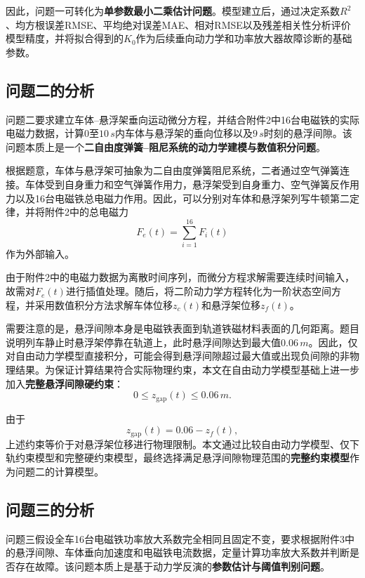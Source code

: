 \documentclass[a4paper]{nmmcm}
\begin{document}
因此，问题一可转化为\textbf{单参数最小二乘估计问题}。模型建立后，通过决定系数$R^2$、均方根误差RMSE、平均绝对误差MAE、相对RMSE以及残差相关性分析评价模型精度，并将拟合得到的$K_0$作为后续垂向动力学和功率放大器故障诊断的基础参数。

\subsection{问题二的分析}

问题二要求建立车体--悬浮架垂向运动微分方程，并结合附件2中16台电磁铁的实际电磁力数据，计算$0$至$10\,s$内车体与悬浮架的垂向位移以及$9\,s$时刻的悬浮间隙。该问题本质上是一个\textbf{二自由度弹簧--阻尼系统的动力学建模与数值积分问题}。

根据题意，车体与悬浮架可抽象为二自由度弹簧阻尼系统，二者通过空气弹簧连接。车体受到自身重力和空气弹簧作用力，悬浮架受到自身重力、空气弹簧反作用力以及16台电磁铁总电磁力作用。因此，可以分别对车体和悬浮架列写牛顿第二定律，并将附件2中的总电磁力
\begin{equation}
F_e(t)=\sum_{i=1}^{16}F_i(t)
\end{equation}
作为外部输入。

由于附件2中的电磁力数据为离散时间序列，而微分方程求解需要连续时间输入，故需对$F_e(t)$进行插值处理。随后，将二阶动力学方程转化为一阶状态空间方程，并采用数值积分方法求解车体位移$z_c(t)$和悬浮架位移$z_f(t)$。

需要注意的是，悬浮间隙本身是电磁铁表面到轨道铁磁材料表面的几何距离。题目说明列车静止时悬浮架停靠在轨道上，此时悬浮间隙达到最大值$0.06\,m$。因此，仅对自由动力学模型直接积分，可能会得到悬浮间隙超过最大值或出现负间隙的非物理结果。为保证计算结果符合实际物理约束，本文在自由动力学模型基础上进一步加入\textbf{完整悬浮间隙硬约束}：
\begin{equation}
0\leq z_{\mathrm{gap}}(t)\leq 0.06\,m.
\end{equation}

由于
\begin{equation}
z_{\mathrm{gap}}(t)=0.06-z_f(t),
\end{equation}
上述约束等价于对悬浮架位移进行物理限制。本文通过比较自由动力学模型、仅下轨约束模型和完整硬约束模型，最终选择满足悬浮间隙物理范围的\textbf{完整约束模型}作为问题二的计算模型。

\subsection{问题三的分析}

问题三假设全车16台电磁铁功率放大系数完全相同且固定不变，要求根据附件3中的悬浮间隙、车体垂向加速度和电磁铁电流数据，定量计算功率放大系数并判断是否存在故障。该问题本质上是基于动力学反演的\textbf{参数估计与阈值判别问题}。
\end{document}
